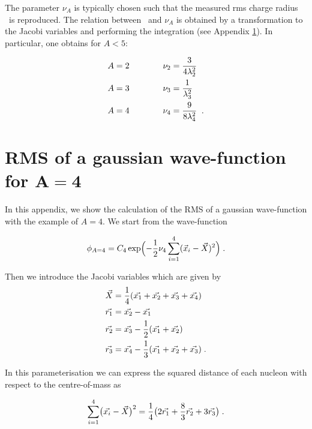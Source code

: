 \documentclass[a4paper,11pt]{scrartcl}
\begin{document}
\begin{appendix}
The parameter $\nu_{A}$ is typically chosen such that the measured rms charge radius \rmsradius~is reproduced. The relation between \rmsradius~and $\nu_{A}$ is obtained by a transformation to the Jacobi variables and performing the integration (see Appendix \ref{appendix:integration}). In particular, one obtains for $A < 5$:

\begin{align}
	A& = 2 \qquad \qquad \nu_{2} = {3 \over {4\ensuremath{\lambda_{2}}^2}}  \\
	A& = 3 \qquad \qquad \nu_{3} = {1 \over {\ensuremath{\lambda_{3}}^2}} \\
	A& = 4 \qquad \qquad \nu_{4} =  {9 \over {8\ensuremath{\lambda_{4}}^2}} \;\; .
\end{align}

\newpage
\section{RMS of a gaussian wave-function for $\mathbf{A=4}$}\label{appendix:integration}

In this appendix, we show the calculation of the RMS of a gaussian wave-function with the example of $A=4$. We start from the wave-function

\begin{equation}\label{eq:SatoWave}
 \phi_{A=4} = C_{4} \exp\Bigl(-{1\over2} \nu_{4} \sum_{i=1}^{4}(\vec{x}_{i} - \vec{X})^2 \Bigr) \; .
\end{equation}

\noindent Then we introduce the Jacobi variables which are given by 
\begin{align}
	\vec{X}    &= {1 \over 4} (\vec{x_1} + \vec{x_2} + \vec{x_3} + \vec{x_4}) \\
	\vec{r_1} &= \vec{x_2} - \vec{x_1}\\
	\vec{r_2} &= \vec{x_3} - {1 \over 2}(\vec{x_1} + \vec{x_2})\\
	\vec{r_3} &= \vec{x_4} - {1 \over 3}(\vec{x_1} + \vec{x_2} + \vec{x_3}) \; .
\end{align}

\noindent In this parameterisation we can express the squared distance of each nucleon with respect to the centre-of-mass as

\begin{equation}
 \sum_{i=1}^{4} \bigl(\vec{x_i} - \vec{X} \bigr)^2 = {1\over 4} \bigl(2\vec{r_1} + {8\over 3}\vec{r_2} + 3\vec{r_3}\bigr)  \; .
\end{equation}


\end{appendix}
\end{document}
